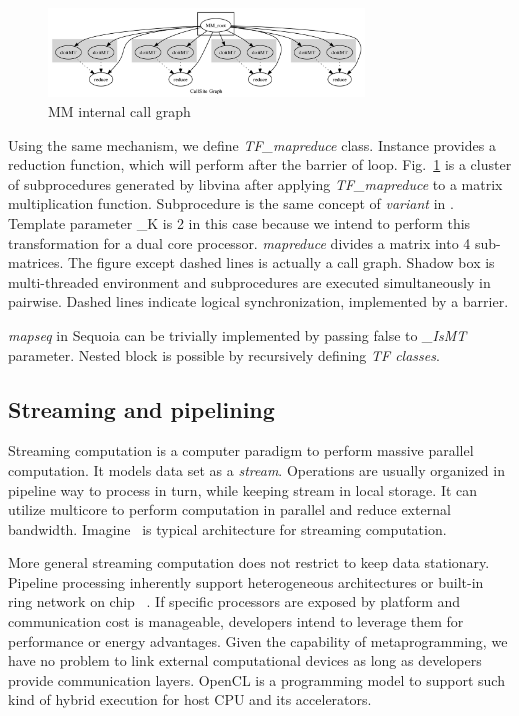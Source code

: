 \documentclass[10pt, conference, compsocconf]{IEEEtran}
\begin{document}
\begin{figure}
\centering
\includegraphics[width=3.3in]{test_matrix}
\caption{MM internal call graph}\label{fig:mm}
\end{figure}

Using the same mechanism, we define \emph{TF\_mapreduce}
class. Instance provides a reduction function, which will perform
after the barrier of loop. Fig.~\ref{fig:mm} is a cluster of
subprocedures generated by libvina after applying \emph{TF\_mapreduce} to a matrix multiplication
function. Subprocedure is the same concept of \emph{variant } in
\cite{sequoia, merge}. Template parameter \_K is 2 in this case because we intend
to perform this transformation for a dual core processor. \emph{mapreduce}
divides a matrix into 4 sub-matrices. The figure except dashed lines
is actually a call graph. Shadow box is multi-threaded environment and
subprocedures are executed simultaneously in pairwise. Dashed lines
indicate logical synchronization, implemented by a barrier.

\emph{mapseq} in Sequoia can be trivially implemented by
passing false to \emph{\_IsMT} parameter. Nested block is possible by
recursively defining \emph{TF classes}.

\subsection{Streaming and pipelining}
Streaming computation is a computer paradigm to perform massive parallel computation. It models data set as a \emph{stream}. Operations are usually organized in pipeline way to process in turn, while keeping stream in local storage. It can utilize multicore to perform computation in parallel and reduce external bandwidth.  Imagine~\cite{imagine} is typical architecture for
streaming computation.


More general streaming computation does not restrict to keep data
stationary. Pipeline processing inherently support heterogeneous
architectures or built-in ring network on chip ~\cite{cellbe, larrabee}. If specific processors
are exposed by platform and communication cost is manageable, developers
intend to leverage  them for performance or energy
advantages. Given the capability of metaprogramming, we have no problem to link external
computational devices as long as developers provide communication
layers. OpenCL is a programming model to support such kind of hybrid
execution for host CPU and its accelerators. 
\end{document}
